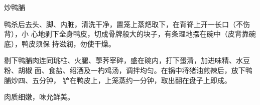 %
%
%
%
%
%
%
\begin{recipe}{炒鸭脯}

\ingredients


\preparation

鸭杀后去头、脚、内脏，清洗干净，置笼上蒸𤆵取下，在背脊上开一长口（不伤背），小
心地剥下全身鸭皮，切成骨牌般大的块子，有条理地摆在碗中（皮背靠碗底），鸭皮须保
持滋润，勿使干燥。

剔下鸭脯肉连同珧柱、火腿、荸荠宰碎，盛在碗内，打下蛋清，加进味精、水豆粉、胡椒
面、食盐、绍酒及一杓鸡汤，调拌均匀。在锅中将猪油煎辣后，放下鸭脯炒四、五分钟，
铲在鸭皮上，上笼蒸约一分钟，取出翻在盘子上即成。

\features

肉质细嫩，味允鲜美。

\end{recipe}

